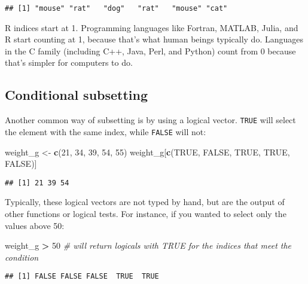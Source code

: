 \documentclass[]{book}
\newenvironment{Shaded}{\begin{snugshade}}{\end{snugshade}}
\newcommand{\CommentTok}[1]{\textcolor[rgb]{0.56,0.35,0.01}{\textit{#1}}}
\newcommand{\DecValTok}[1]{\textcolor[rgb]{0.00,0.00,0.81}{#1}}
\newcommand{\KeywordTok}[1]{\textcolor[rgb]{0.13,0.29,0.53}{\textbf{#1}}}
\newcommand{\NormalTok}[1]{#1}
\newcommand{\OperatorTok}[1]{\textcolor[rgb]{0.81,0.36,0.00}{\textbf{#1}}}
\newcommand{\OtherTok}[1]{\textcolor[rgb]{0.56,0.35,0.01}{#1}}
\newcommand{\StringTok}[1]{\textcolor[rgb]{0.31,0.60,0.02}{#1}}
\begin{document}
\begin{verbatim}
## [1] "mouse" "rat"   "dog"   "rat"   "mouse" "cat"
\end{verbatim}

R indices start at 1. Programming languages like Fortran, MATLAB, Julia, and R start counting at 1, because that's what human beings typically do. Languages in the C family (including C++, Java, Perl, and Python) count from 0 because that's simpler for computers to do.

\hypertarget{conditional-subsetting}{%
\subsection{Conditional subsetting}\label{conditional-subsetting}}

Another common way of subsetting is by using a logical vector. \texttt{TRUE} will select the element with the same index, while \texttt{FALSE} will not:

\begin{Shaded}
\begin{Highlighting}[]
\NormalTok{weight_g <-}\StringTok{ }\KeywordTok{c}\NormalTok{(}\DecValTok{21}\NormalTok{, }\DecValTok{34}\NormalTok{, }\DecValTok{39}\NormalTok{, }\DecValTok{54}\NormalTok{, }\DecValTok{55}\NormalTok{)}
\NormalTok{weight_g[}\KeywordTok{c}\NormalTok{(}\OtherTok{TRUE}\NormalTok{, }\OtherTok{FALSE}\NormalTok{, }\OtherTok{TRUE}\NormalTok{, }\OtherTok{TRUE}\NormalTok{, }\OtherTok{FALSE}\NormalTok{)]}
\end{Highlighting}
\end{Shaded}

\begin{verbatim}
## [1] 21 39 54
\end{verbatim}

Typically, these logical vectors are not typed by hand, but are the output of other functions or logical tests. For instance, if you wanted to select only the values above 50:

\begin{Shaded}
\begin{Highlighting}[]
\NormalTok{weight_g }\OperatorTok{>}\StringTok{ }\DecValTok{50}   \CommentTok{# will return logicals with TRUE for the indices that meet the condition}
\end{Highlighting}
\end{Shaded}

\begin{verbatim}
## [1] FALSE FALSE FALSE  TRUE  TRUE
\end{verbatim}
\end{document}
